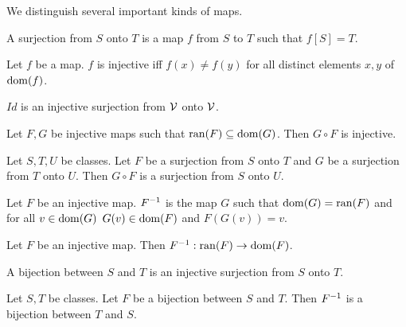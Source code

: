 \documentclass{article}
\begin{document}
We distinguish several important kinds of maps.
%
\begin{forthel}
\begin{definition}
A surjection from $S$
onto $T$ is a map $f$ from $S$ to $T$ such that $f[S] = T$.
\end{definition}

\begin{definition}
Let $f$ be a map. $f$ is injective iff $f(x) \neq f(y)$ for all
distinct elements $x,y$ of $\operatorname{dom}(f)$.
\end{definition}

\begin{lemma}
$Id$ is an injective surjection from ${\cal V}$ onto ${\cal V}$.
\end{lemma}

\begin{lemma}
Let $F,G$ be injective maps such that $\operatorname{ran}(F) \subseteq \operatorname{dom}(G)$.
Then $G \circ F$ is injective.
\end{lemma}

\begin{lemma} Let $S,T,U$ be classes. Let
$F$ be a surjection from $S$ onto $T$ and $G$ be
a surjection from $T$ onto $U$. Then
$G \circ F$ is a surjection from $S$ onto $U$.
\end{lemma}

\begin{signature}
Let $F$ be an injective map.
$F^{-1}$ is the map $G$ such that $\operatorname{dom}(G) = \operatorname{ran}(F)$
and for all $v \in \operatorname{dom}(G)$ $G(v) \in \operatorname{dom}(F)$ and $F(G(v))=v$.
\end{signature}

\begin{lemma}
Let $F$ be an injective map. Then
$F^{-1} : \operatorname{ran}(F) \rightarrow \operatorname{dom}(F)$.
\end{lemma}


\begin{definition}
A bijection between $S$ and $T$ is an injective surjection from
$S$ onto $T$.
\end{definition}

\begin{lemma} Let $S, T$ be classes.
Let $F$ be a bijection between $S$ and $T$.
Then $F^{-1}$ is a bijection between $T$ and $S$.
\end{lemma}
\end{forthel}
%
\end{document}
